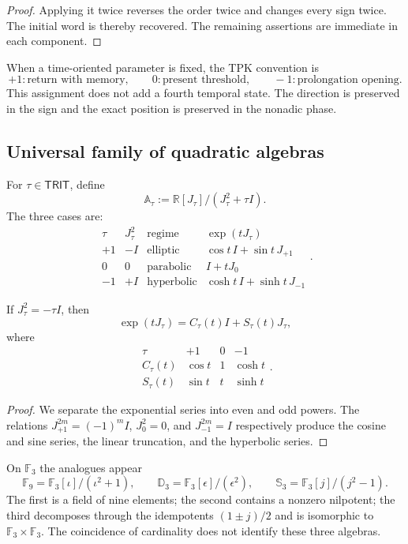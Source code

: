 \begin{proof}
Applying it twice reverses the order twice and changes every sign twice.
The initial word is thereby recovered. The remaining assertions are
immediate in each component.
\end{proof}

When a time-oriented parameter is fixed, the TPK convention is
\[
 +1:\text{return with memory},
 \qquad
 0:\text{present threshold},
 \qquad
 -1:\text{prolongation opening}.
\]
This assignment does not add a fourth temporal state. The direction is preserved
in the sign and the exact position is preserved in the nonadic phase.

\subsection{Universal family of quadratic algebras}

For \(\tau\in\mathsf{TRIT}\), define
\[
 \mathbb A_\tau:=\mathbb R[J_\tau]/(J_\tau^2+\tau I).
\]
The three cases are:
\[
\begin{array}{c|c|c|c}
\tau&J_\tau^2&\text{regime}&\exp(tJ_\tau)\\\hline
+1&-I&\text{elliptic}&\cos t\,I+\sin t\,J_{+1}\\
0&0&\text{parabolic}&I+tJ_0\\
-1&+I&\text{hyperbolic}&\cosh t\,I+\sinh t\,J_{-1}
\end{array}.
\]

\begin{theorem}
\label{p12-83-c1-s11:thm:trit-exponencial-uniforme}
If \(J_\tau^2=-\tau I\), then
\[
 \exp(tJ_\tau)
 =C_\tau(t)I+S_\tau(t)J_\tau,
\]
where
\[
\begin{array}{c|ccc}
\tau&+1&0&-1\\\hline
C_\tau(t)&\cos t&1&\cosh t\\
S_\tau(t)&\sin t&t&\sinh t
\end{array}.
\]
\end{theorem}

\begin{proof}
We separate the exponential series into even and odd powers. The relations
\(J_{+1}^{2m}=(-1)^mI\), \(J_0^2=0\), and
\(J_{-1}^{2m}=I\) respectively produce the cosine and sine series,
the linear truncation, and the hyperbolic series.
\end{proof}

On \(\mathbb F_3\) the analogues appear
\[
 \mathbb F_9=\mathbb F_3[\iota]/(\iota^2+1),
 \qquad
 \mathbb D_3=\mathbb F_3[\epsilon]/(\epsilon^2),
 \qquad
 \mathbb S_3=\mathbb F_3[j]/(j^2-1).
\]
The first is a field of nine elements; the second contains a nonzero
nilpotent; the third decomposes through the idempotents
\((1\pm j)/2\) and is isomorphic to \(\mathbb F_3\times\mathbb F_3\). The
coincidence of cardinality does not identify these three algebras.

